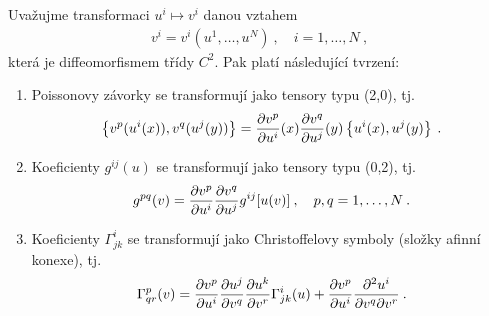 \begin{proposition} \label{prop:transoformace}
    Uvažujme transformaci $u^i \mapsto v^i $  danou vztahem
    \begin{align}
        v^i = v^i (u^1, \dots, u^N) \:, \quad i = 1, \dots, N \:, \label{eq:transform}
    \end{align}
    která je diffeomorfismem třídy $C^2$.
    Pak platí následující tvrzení:
    \begin{enumerate}
        \item Poissonovy závorky se transformují jako tensory typu (2,0), tj.
        \begin{align}
            \left \lbrace v^p(u^i(x)),v^q(u^j(y)) \right \rbrace = \frac{\partial v^p}{\partial u^i}(x) \frac{\partial v^q}{\partial u^j}(y) \left \lbrace u^i(x),u^j(y) \right \rbrace \:. \label{eq:transformace-zavorka}
        \end{align}
        \item Koeficienty $g^{ij}(u)$ se transformují jako tensory typu (0,2), tj.
        \begin{align}
            g^{pq}(v) = \frac{\partial v^p}{\partial u^i} \frac{\partial v^q}{\partial u^j} g^{ij}[u(v)] \:, \quad p, q = 1, \dots, N \:. \label{eq:transformace-metrika}
        \end{align}
        \item Koeficienty $\Gamma^i_{jk}$ se transformují jako Christoffelovy symboly (složky afinní konexe), tj.
        \begin{align}
            \Gamma^p_{qr} (v) = \frac{\partial v^p}{\partial u^i} \frac{\partial u^j}{\partial v^q} \frac{\partial u^k}{\partial v^r} \Gamma^i_{jk}(u) + \frac{\partial v^p}{\partial u^i} \frac{\partial^2 u^i}{\partial v^q \partial v^r} \:. \label{eq:transformace-konexe}
        \end{align}
    \end{enumerate}
\end{proposition}

